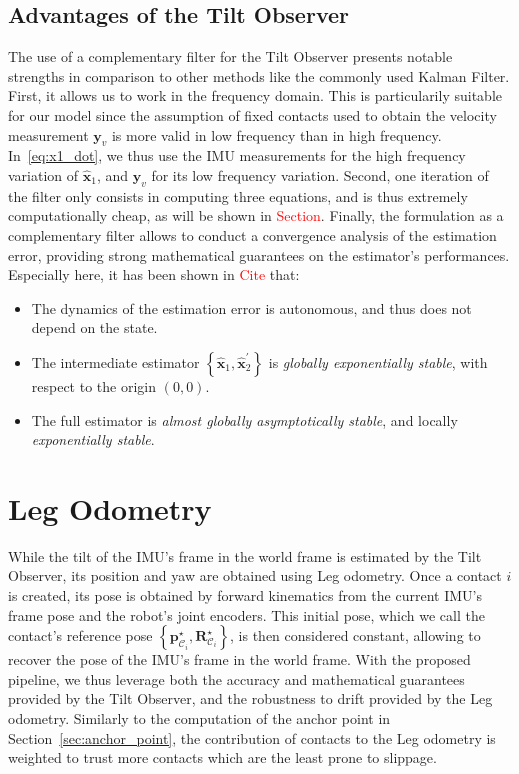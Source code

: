 \documentclass{IJCAS}
\begin{document}
\subsection{Advantages of the Tilt Observer}
The use of a complementary filter for the Tilt Observer presents notable strengths in comparison to other methods like the commonly used Kalman Filter. First, it allows us to work in the frequency domain. This is particularily suitable for our model since the assumption of fixed contacts used to obtain the velocity measurement $\boldsymbol{y}_v$ is more valid in low frequency than in high frequency. In~\eqref{eq:x1_dot}, we thus use the IMU measurements for the high frequency variation of $\hat{\boldsymbol{x}}_{1}$, and $\boldsymbol{y}_v$ for its low frequency variation. Second, one iteration of the filter only consists in computing three equations, and is thus extremely computationally cheap, as will be shown in \textcolor{red}{Section}. Finally, the formulation as a complementary filter allows to conduct a convergence analysis of the estimation error, providing strong mathematical guarantees on the estimator's performances. Especially here, it has been shown in \textcolor{red}{Cite} that:
\begin{itemize}
    \item The dynamics of the estimation error is autonomous, and thus does not depend on the state. 
    \item The intermediate estimator $\left\{\hat{\boldsymbol{x}}_{1}, \hat{\boldsymbol{x}}_{2}^{\prime} \right\}$ is \emph{globally exponentially stable}, with respect to the origin $\left(0,0\right)$.
    \item The full estimator is \emph{almost globally asymptotically stable}, and locally \emph{exponentially stable}.
\end{itemize}

\section{Leg Odometry}

While the tilt of the IMU's frame in the world frame is estimated by the Tilt Observer, its position and yaw are obtained using Leg odometry. Once a contact $i$ is created, its pose is obtained by forward kinematics from the current IMU's frame pose and the robot's joint encoders. This initial pose, which we call the contact's reference pose $\left\{ \boldsymbol{p}^{\star}_{\mathcal{C}_{i}}, \boldsymbol{R}^{\star}_{\mathcal{C}_{i}}\right\}$, is then considered constant, allowing to recover the pose of the IMU's frame in the world frame. 
With the proposed pipeline, we thus leverage both the accuracy and mathematical guarantees provided by the Tilt Observer, and the robustness to drift provided by the Leg odometry. Similarly to the computation of the anchor point in Section~\ref{sec:anchor_point}, the contribution of contacts to the Leg odometry is weighted to trust more contacts which are the least prone to slippage.
\end{document}
